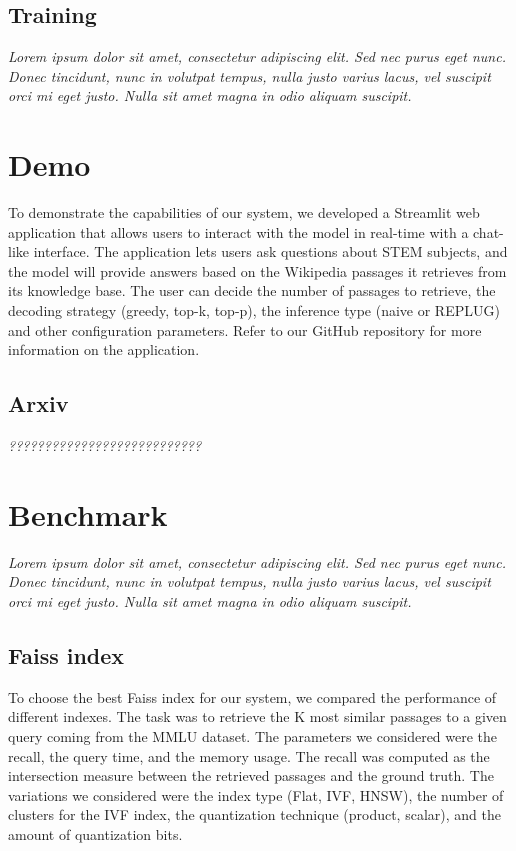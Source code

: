 \documentclass[11pt]{article}
\begin{document}
\subsection{Training}

\textit{Lorem ipsum dolor sit amet, consectetur adipiscing elit. Sed nec purus eget
nunc. Donec tincidunt, nunc in volutpat tempus, nulla justo varius lacus, vel
suscipit orci mi eget justo. Nulla sit amet magna in odio aliquam suscipit.}

\section{Demo}

To demonstrate the capabilities of our system, we developed a Streamlit web application
that allows users to interact with the model in real-time with a chat-like interface. 
The application lets users ask questions about STEM subjects, and the model will provide answers 
based on the Wikipedia passages it retrieves from its knowledge base. 
The user can decide the number of passages to retrieve, the decoding strategy (greedy, top-k, top-p), 
the inference type (naive or REPLUG) and other configuration parameters.
Refer to our GitHub repository for more information on the application.

\subsection{Arxiv}

\textit{???????????????????????????}

\section{Benchmark}

\textit{Lorem ipsum dolor sit amet, consectetur adipiscing elit. Sed nec purus eget
nunc. Donec tincidunt, nunc in volutpat tempus, nulla justo varius lacus, vel
suscipit orci mi eget justo. Nulla sit amet magna in odio aliquam suscipit.}

\subsection{Faiss index}

To choose the best Faiss index for our system, we compared the performance of 
different indexes. The task was to retrieve the K most similar passages to a
given query coming from the MMLU dataset.
The parameters we considered were the recall, the query time, 
and the memory usage. 
The recall was computed as the intersection measure between the retrieved 
passages and the ground truth. 
The variations we considered were the index type (Flat, IVF, HNSW), the number 
of clusters for the IVF index, the quantization technique (product, scalar), and
the amount of quantization bits.
\end{document}
